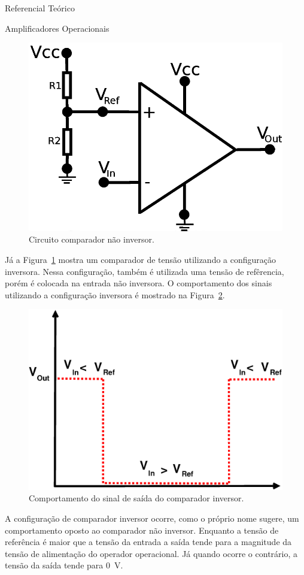 \begin{chapter}{Referencial Teórico}
\begin{section}{Amplificadores Operacionais}
\begin{figure}[!h]
	\centering
	\begin{minipage}[c]{\textwidth}
	\centering
	\includegraphics[width=0.5\linewidth]{fig/inversor}
	\caption{Circuito comparador não inversor.}
	\label{fig:comparador2}
	\end{minipage}
\end{figure}

Já a Figura~\ref{fig:comparador2} mostra um comparador de tensão utilizando a
configuração inversora. Nessa configuração, também é utilizada uma tensão de
refêrencia, porém é colocada na entrada não inversora. O comportamento dos sinais
utilizando a configuração inversora é mostrado na Figura~\ref{fig:sinal2}. 


\begin{figure}[!h]
	\centering
	\begin{minipage}[c]{\textwidth}
	\centering
	\includegraphics[width=0.55\linewidth]{fig/comparador_inversor}
	\caption{Comportamento do sinal de saída do comparador inversor.}
	\label{fig:sinal2}
	\end{minipage}
\end{figure}

A configuração de comparador inversor ocorre, como o próprio nome sugere, um
comportamento oposto ao comparador não inversor. Enquanto a tensão de referência
é maior que a tensão da entrada a saída tende para a magnitude da tensão de
alimentação do operador operacional. Já quando ocorre o contrário,  a tensão da
saída tende para 0~V.


\end{section}
\end{chapter}
